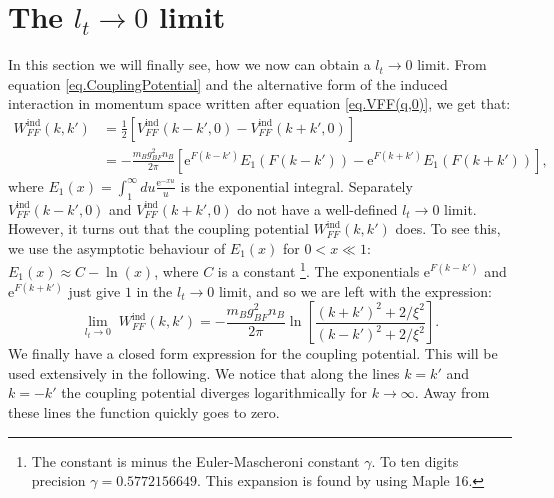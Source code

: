 \section{The $l_t \to 0$ limit}
In this section we will finally see, how we now can obtain a $l_t\to 0$ limit. From equation \eqref{eq.CouplingPotential} and the alternative form of the induced interaction in momentum space written after equation \eqref{eq.VFF(q,0)}, we get that:
\begin{align}
W^\text{ind}_{FF}(k,k') &= \frac{1}{2}\left[V^\text{ind}_{FF}(k-k',0) - V^\text{ind}_{FF}(k+k',0)\right] \nonumber \\
&= -\frac{m_Bg_{BF}^2n_B}{2\pi}\left[ \text{e}^{F(k-k')} E_1(F(k-k')) - \text{e}^{F(k+k')} E_1(F(k+k')) \right], \nonumber
\end{align}
where $E_1(x) = \int_1^\infty du \frac{\text{e}^{-xu}}{u}$ is the exponential integral. Separately $V^\text{ind}_{FF}(k-k',0)$ and $V^\text{ind}_{FF}(k+k',0)$ do not have a well-defined $l_t \to 0$ limit. However, it turns out that the coupling potential $W^\text{ind}_{FF}(k,k')$ does. To see this, we use the asymptotic behaviour of $E_1(x)$ for $0 < x \ll 1$: $E_1(x) \approx C -\ln(x)$, where $C$ is a constant \footnote{The constant is minus the Euler-Mascheroni constant $\gamma$. To ten digits precision $\gamma = 0.5772156649$. This expansion is found by using Maple 16.}. The exponentials $\text{e}^{F(k-k')}$ and $\text{e}^{F(k+k')}$ just give $1$ in the $l_t \to 0$ limit, and so we are left with the expression:
\begin{equation}
\lim_{l_t \to 0} \; W^\text{ind}_{FF}(k,k') = -\frac{m_Bg_{BF}^2n_B}{2\pi} \ln\left[\frac{(k+k')^2+2/\xi^2}{(k-k')^2+2/\xi^2}\right].
\label{eq.CouplingPotentiallt=0} 
\end{equation}
We finally have a closed form expression for the coupling potential. This will be used extensively in the following. We notice that along the lines $k = k'$ and $k = -k'$ the coupling potential diverges logarithmically for $k\to \infty$. Away from these lines the function quickly goes to zero.

